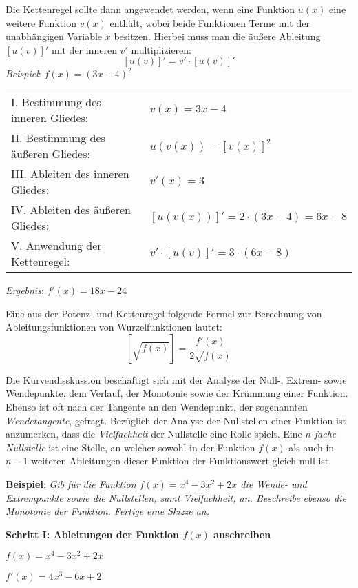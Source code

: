\pagebreak


Die Kettenregel sollte dann angewendet werden, wenn eine Funktion $u(x)$ eine weitere Funktion $v(x)$ enth\"{a}lt, wobei beide Funktionen Terme mit der unabh\"{a}ngigen Variable $x$ besitzen. Hierbei muss man die \"{a}u\ss{}ere Ableitung $[u(v)]'$ mit der inneren $v'$ multiplizieren: $$[u(v)]' = v' \cdot [u(v)]'$$
\emph{Beispiel}: $f(x) = (3x - 4)^2$

\begin{tabular}{l l}
	I. Bestimmung des inneren Gliedes: & $v(x) = 3x - 4$
	\extrapar \\
	II. Bestimmung des \"{a}u\ss{}eren Gliedes: & $u(v(x)) = [v(x)]^2$
	\extrapar \\
	III. Ableiten des inneren Gliedes: & $v'(x) = 3$
	\extrapar \\
	IV. Ableiten des \"{a}u\ss{}eren Gliedes: & $[u(v(x))]' = 2 \cdot (3x - 4) = 6x - 8$
	\extrapar \\
	V. Anwendung der Kettenregel: & $v' \cdot [u(v)]' = 3 \cdot (6x - 8)$
\end{tabular}

\emph{Ergebnis}: $f'(x) = 18x - 24$

Eine aus der Potenz- und Kettenregel folgende Formel zur Berechnung von Ableitungsfunktionen von Wurzelfunktionen lautet: $$\left[\sqrt{f(x)}\right] = \frac{f'(x)}{2\sqrt{f(x)}}$$

Die Kurvendisskussion besch\"{a}ftigt sich mit der Analyse der Null-, Extrem- sowie Wendepunkte, dem Verlauf, der Monotonie sowie der Kr\"{u}mmung einer Funktion. Ebenso ist oft nach der Tangente an den Wendepunkt, der sogenannten \emph{Wendetangente}, gefragt. Bez\"{u}glich der Analyse der Nullstellen einer Funktion ist anzumerken, dass die \emph{Vielfachheit} der Nullstelle eine Rolle spielt. Eine \emph{$n$-fache Nullstelle} ist eine Stelle, an welcher sowohl in der Funktion $f(x)$ als auch in $n-1$ weiteren Ableitungen dieser Funktion der Funktionswert gleich null ist. 

\textbf{Beispiel}: \emph{Gib f\"{u}r die Funktion $f(x) = x^4 - 3x^2 + 2x$ die Wende- und Extrempunkte sowie die Nullstellen, samt Vielfachheit, an. Beschreibe ebenso die Monotonie der Funktion. Fertige eine Skizze an.}

\textbf{Schritt I: Ableitungen der Funktion $f(x)$ anschreiben}

$f(x) = x^4 - 3x^2 + 2x$

$f'(x) = 4x^3 - 6x + 2$

